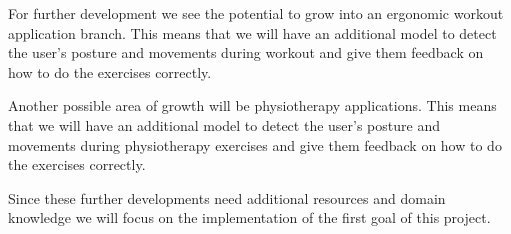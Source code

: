 For further development we see the potential to grow into an ergonomic workout application branch. This means that
we will have an additional model to detect the user's posture and movements during workout and give them feedback on how to do the exercises correctly.

Another possible area of growth will be physiotherapy applications. 
This means that we will have an additional model to detect the user's posture and movements
during physiotherapy exercises and give them feedback on how to do the exercises correctly.

Since these further developments need additional resources and domain knowledge we will focus on the implementation
of the first goal of this project. 